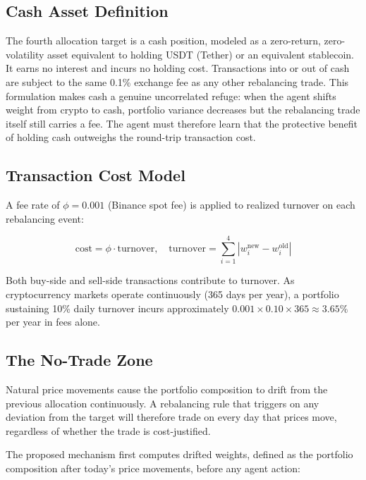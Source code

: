 \documentclass[pdflatex,sn-mathphys-num]{sn-jnl}
\begin{document}
\subsection{Cash Asset Definition}

The fourth allocation target is a cash position, modeled as a zero-return,
zero-volatility asset equivalent to holding USDT (Tether) or an equivalent
stablecoin. It earns no interest and incurs no holding cost. Transactions into
or out of cash are subject to the same 0.1\% exchange fee as any other
rebalancing trade. This formulation makes cash a genuine uncorrelated refuge:
when the agent shifts weight from crypto to cash, portfolio variance decreases
but the rebalancing trade itself still carries a fee. The agent must therefore
learn that the protective benefit of holding cash outweighs the round-trip
transaction cost.

\subsection{Transaction Cost Model}\label{sec:cost}

A fee rate of $\phi = 0.001$ (Binance spot fee) is applied to realized
turnover on each rebalancing event:

\begin{equation}\label{eq:cost}
    \mathrm{cost} = \phi \cdot \mathrm{turnover}, \quad
    \mathrm{turnover} = \sum_{i=1}^{4} |w_i^{\mathrm{new}} - w_i^{\mathrm{old}}|
\end{equation}

Both buy-side and sell-side transactions contribute to turnover. As
cryptocurrency markets operate continuously (365 days per year), a portfolio
sustaining 10\% daily turnover incurs approximately
$0.001 \times 0.10 \times 365 \approx 3.65\%$ per year in fees alone.

\subsection{The No-Trade Zone}\label{sec:notrade}

Natural price movements cause the portfolio composition to drift from the
previous allocation continuously. A rebalancing rule that triggers on any
deviation from the target will therefore trade on every day that prices move,
regardless of whether the trade is cost-justified.

The proposed mechanism first computes drifted weights, defined as the portfolio
composition after today's price movements, before any agent action:
\end{document}
